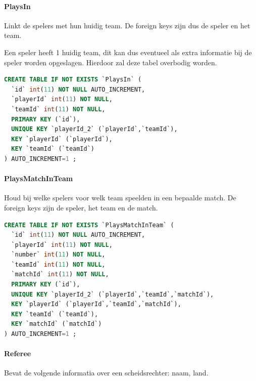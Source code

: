 \documentclass[11pt]{article}
\begin{document}
        
        
        
    \paragraph{PlaysIn}
        Linkt de spelers met hun huidig team.
        De foreign keys zijn dus de speler en het team.
        
        Een speler heeft 1 huidig team, dit kan dus eventueel als extra informatie bij de speler worden opgeslagen.
        Hierdoor zal deze tabel overbodig worden.
        
        \begin{framed}
        \begin{lstlisting}[language=sql]
CREATE TABLE IF NOT EXISTS `PlaysIn` (
  `id` int(11) NOT NULL AUTO_INCREMENT,
  `playerId` int(11) NOT NULL,
  `teamId` int(11) NOT NULL,
  PRIMARY KEY (`id`),
  UNIQUE KEY `playerId_2` (`playerId`,`teamId`),
  KEY `playerId` (`playerId`),
  KEY `teamId` (`teamId`)
) AUTO_INCREMENT=1 ;
        \end{lstlisting}
        \end{framed}
        
        
        
    \paragraph{PlaysMatchInTeam}
        Houd bij welke spelers voor welk team speelden in een bepaalde match.
        De foreign keys zijn de speler, het team en de match.
        
        \begin{framed}
        \begin{lstlisting}[language=sql]
CREATE TABLE IF NOT EXISTS `PlaysMatchInTeam` (
  `id` int(11) NOT NULL AUTO_INCREMENT,
  `playerId` int(11) NOT NULL,
  `number` int(11) NOT NULL,
  `teamId` int(11) NOT NULL,
  `matchId` int(11) NOT NULL,
  PRIMARY KEY (`id`),
  UNIQUE KEY `playerId_2` (`playerId`,`teamId`,`matchId`),
  KEY `playerId` (`playerId`,`teamId`,`matchId`),
  KEY `teamId` (`teamId`),
  KEY `matchId` (`matchId`)
) AUTO_INCREMENT=1 ;
        \end{lstlisting}
        \end{framed}
        
        
        
    
    \paragraph{Referee}
        Bevat de volgende informatia over een scheidsrechter:
            naam, land.
            
\end{document}
